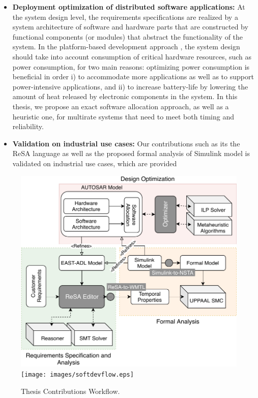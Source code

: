 \begin{itemize}
\item \textbf{Deployment optimization of distributed software applications: }
At the system design level, the requirements specifications are realized by a system architecture of software and hardware parts that are constructed by functional components (or modules) that abstract the functionality of the system. In the platform-based development approach \cite{Sangiovanni-Vincentelli2004BenefitsDesign}, the system design should take into account consumption of critical hardware resources, such as power consumption, for two main reasons: optimizing power consumption is beneficial in order i) to accommodate more applications as well as to support power-intensive applications, and ii) to increase battery-life by lowering the amount of heat released by electronic components in the system. In this thesis, we propose an exact software allocation approach, as well as a heuristic one, for multirate systems that need to meet both timing and reliability.
\item \textbf{Validation on industrial use cases: } 
Our contributions such as its the ReSA language as well as the proposed formal analysis of Simulink model is validated on industrial use cases, which are provided
\end{itemize}
\begin{figure}
	\centering
	\ifpdf
	\includegraphics[width=\linewidth]{images/softdevflow}
	\else
	\texttt{[image: images/softdevflow.eps]}
	\fi
	\caption{Thesis Contributions Workflow.} 
\end{figure}

